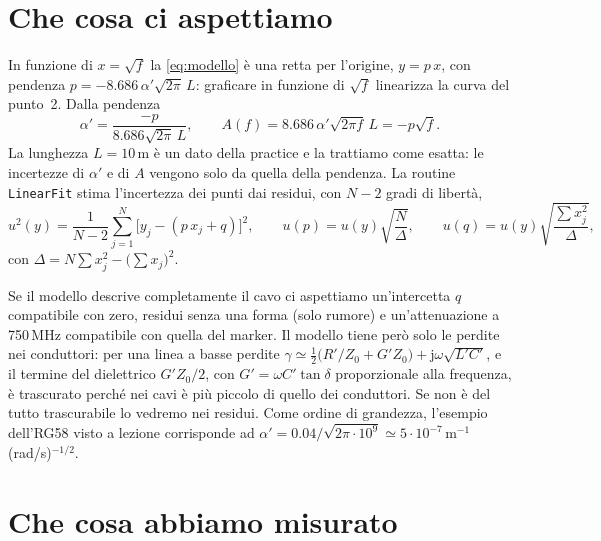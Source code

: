 \documentclass[11pt,a4paper,oneside]{book}
\begin{document}
\section{Che cosa ci aspettiamo}
In funzione di $x = \sqrt f$ la \eqref{eq:modello} è una retta per l'origine, $y = p\,x$, con pendenza $p = -8.686\,\alpha'\sqrt{2\pi}\,L$: graficare in funzione di $\sqrt f$ linearizza la curva del punto~2. Dalla pendenza
\begin{equation}
\alpha' = \frac{-p}{8.686\sqrt{2\pi}\,L}, \qquad A(f) = 8.686\,\alpha'\sqrt{2\pi f}\,L = -p\sqrt f .
\end{equation}
La lunghezza $L = 10$\,m è un dato della practice e la trattiamo come esatta: le incertezze di $\alpha'$ e di $A$ vengono solo da quella della pendenza. La routine \texttt{LinearFit} stima l'incertezza dei punti dai residui, con $N-2$ gradi di libertà,
\begin{equation}
u^2(y) = \frac{1}{N-2}\sum_{j=1}^{N}\big[y_j-(p\,x_j+q)\big]^2 , \qquad u(p) = u(y)\sqrt{\frac{N}{\Delta}}, \qquad u(q) = u(y)\sqrt{\frac{\sum x_j^2}{\Delta}},
\end{equation}
con $\Delta = N\sum x_j^2-\big(\sum x_j\big)^2$.

Se il modello descrive completamente il cavo ci aspettiamo un'intercetta $q$ compatibile con zero, residui senza una forma (solo rumore) e un'attenuazione a 750\,MHz compatibile con quella del marker. Il modello tiene però solo le perdite nei conduttori: per una linea a basse perdite $\gamma\simeq\frac12\big(R'/Z_0+G'Z_0\big)+\mathrm{j}\omega\sqrt{L'C'}$, e il termine del dielettrico $G'Z_0/2$, con $G' = \omega C'\tan\delta$ proporzionale alla frequenza, è trascurato perché nei cavi è più piccolo di quello dei conduttori. Se non è del tutto trascurabile lo vedremo nei residui. Come ordine di grandezza, l'esempio dell'RG58 visto a lezione corrisponde ad $\alpha' = 0.04/\sqrt{2\pi\cdot10^9}\simeq5\cdot10^{-7}$\,m$^{-1}$(rad/s)$^{-1/2}$.

\section{Che cosa abbiamo misurato}
\end{document}
